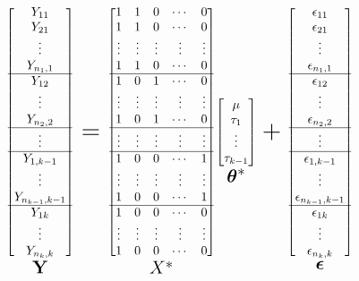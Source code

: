 \documentclass[]{book}
\newcommand{\E}{\boldsymbol\epsilon}
\theoremstyle{definition}
\theoremstyle{definition}
\theoremstyle{definition}
\theoremstyle{remark}
\begin{document}
\[
\underset{\huge \mathbf{Y}}{\begin{bmatrix}
  Y_{11} \\
  Y_{21} \\
  \vdots \\
  Y_{n_1, 1} \\ \hline
  Y_{12} \\
  \vdots \\
  Y_{n_2, 2} \\ \hline
  \vdots \\ \hline
  Y_{1, k - 1} \\
  \vdots \\
  Y_{n_{k - 1}, k - 1} \\ \hline
  Y_{1k} \\
  \vdots \\
  Y_{n_k, k}
\end{bmatrix}} = \underset{\huge X^{\ast}}{\begin{bmatrix}
  1 & 1 & 0 & \cdots & 0 \\
  1 & 1 & 0 & \cdots & 0 \\
  \vdots & \vdots & \vdots & \vdots & \vdots \\
  1 & 1 & 0 & \cdots & 0 \\ \hline
  1 & 0 & 1 & \cdots & 0 \\
  \vdots & \vdots & \vdots & \vdots & \vdots \\
  1 & 0 & 1 & \cdots & 0 \\ \hline
  \vdots & \vdots & \vdots & \vdots & \vdots \\ \hline
  1 & 0 & 0 & \cdots & 1 \\
  \vdots & \vdots & \vdots & \vdots & \vdots \\
  1 & 0 & 0 & \cdots & 1 \\ \hline
  1 & 0 & 0 & \cdots & 0 \\
  \vdots & \vdots & \vdots & \vdots & \vdots \\
  1 & 0 & 0 & \cdots & 0
\end{bmatrix}} \underset{\huge \boldsymbol\theta^{\ast}}{\begin{bmatrix}
  \mu \\
  \tau_1 \\
  \vdots \\
  \tau_{k - 1}
\end{bmatrix}} + \underset{\huge \E}{\begin{bmatrix}
  \epsilon_{11} \\
  \epsilon_{21} \\
  \vdots \\
  \epsilon_{n_1, 1} \\ \hline
  \epsilon_{12} \\
  \vdots \\
  \epsilon_{n_2, 2} \\ \hline
  \vdots \\ \hline
  \epsilon_{1, k - 1} \\
  \vdots \\
  \epsilon_{n_{k - 1}, k - 1} \\ \hline
  \epsilon_{1k} \\
  \vdots \\
  \epsilon_{n_k,k}
\end{bmatrix}}
\]
\end{document}
